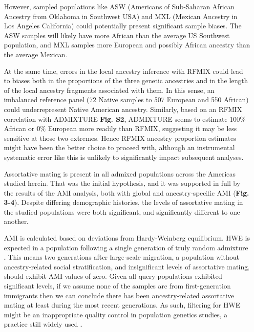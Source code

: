 \documentclass[11pt]{article}
\begin{document}
However, sampled populations like ASW (Americans of Sub-Saharan African Ancestry from Oklahoma in Southwest USA) and  MXL (Mexican Ancestry in Los Angeles California) could potentially present significant sample biases. The ASW samples will likely have more African than the average US Southwest population, and MXL samples more European and possibly African ancestry than the average Mexican.

At the same time, errors in the local ancestry inference with RFMIX could lead to biases both in the proportions of the three genetic ancestries and in the length of the local ancestry fragments associated with them. In this sense, an imbalanced reference panel (72 Native samples to 507 European and 550 African) could underrepresent Native American ancestry. Similarly, based on an RFMIX correlation with ADMIXTURE \textbf{Fig. S2}, ADMIXTURE seems to estimate 100\% African or 0\% European more readily than RFMIX, suggesting it may be less sensitive at those two extremes. Hence RFMIX ancestry proportion estimates might have been the better choice to proceed with, although an instrumental systematic error like this is unlikely to significantly impact subsequent analyses.

Assortative mating is present in all admixed populations across the Americas studied herein. That was the initial hypothesis, and it was supported in full by the results of the AMI analysis, both with global and ancestry-specific AMI (\textbf{Fig. 3-4}). Despite differing demographic histories, the levels of assortative mating in the studied populations were both significant, and significantly different to one another.

AMI is calculated based on deviations from  Hardy-Weinberg equilibrium.  HWE is expected in a population following a single generation of truly random admixture \parencite{Smithjohn2015}. This means two generations after large-scale migration, a population without ancestry-related social stratification, and insignificant levels of assortative mating, should exhibit AMI values of zero. Given all query populations exhibited significant levels, if we assume none of the samples are from first-generation immigrants then we can conclude there has been ancestry-related assortative mating at least during the most recent generations. As such, filtering for HWE might be an inappropriate quality control in population genetics studies, a practice still widely used \parencite{Linares-Pineda2012,Smithjohn2015}.
\end{document}
